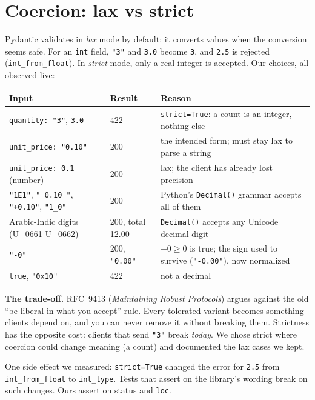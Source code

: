 \documentclass[11pt,a4paper]{article}
\newcommand{\code}[1]{\texttt{#1}}
\begin{document}
\section{Coercion: lax vs strict}

Pydantic validates in \emph{lax} mode by default: it converts values when the
conversion seems safe. For an \code{int} field, \code{"3"} and \code{3.0} become
\code{3}, and \code{2.5} is rejected (\code{int\_from\_float}). In \emph{strict} mode,
only a real integer is accepted. Our choices, all observed live:

\begin{tabularx}{\linewidth}{@{}l l L@{}}
\toprule
\textbf{Input} & \textbf{Result} & \textbf{Reason} \\
\midrule
\code{quantity: "3"}, \code{3.0} & 422 & \code{strict=True}: a count is an integer, nothing else \\
\code{unit\_price: "0.10"} & 200 & the intended form; must stay lax to parse a string \\
\code{unit\_price: 0.1} (number) & 200 & lax; the client has already lost precision \\
\code{"1E1"}, \code{" 0.10 "}, \code{"+0.10"}, \code{"1\_0"} & 200 & Python's \code{Decimal()} grammar accepts all of them \\
Arabic-Indic digits (U+0661 U+0662) & 200, total 12.00 & \code{Decimal()} accepts any Unicode decimal digit \\
\code{"-0"} & 200, \code{"0.00"} & $-0 \ge 0$ is true; the sign used to survive (\code{"-0.00"}), now normalized \\
\code{true}, \code{"0x10"} & 422 & not a decimal \\
\bottomrule
\end{tabularx}

\textbf{The trade-off.} RFC~9413 (\emph{Maintaining Robust Protocols}) argues against
the old ``be liberal in what you accept'' rule. Every tolerated variant becomes
something clients depend on, and you can never remove it without breaking them.
Strictness has the opposite cost: clients that send \code{"3"} break \emph{today}. We
chose strict where coercion could change meaning (a count) and documented the lax
cases we kept.

One side effect we measured: \code{strict=True} changed the error for \code{2.5} from
\code{int\_from\_float} to \code{int\_type}. Tests that assert on the library's
wording break on such changes. Ours assert on status and \code{loc}.
\end{document}
